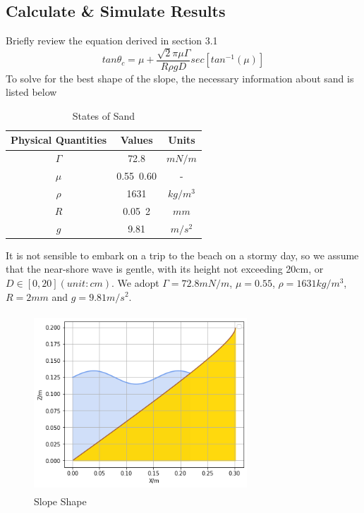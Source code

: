 \documentclass[12pt]{article}
\begin{document}
\subsection{Calculate \& Simulate Results}
Briefly review the equation derived in section 3.1
$$tan\theta_c = \mu + \frac{\sqrt{2}\pi\mu\Gamma}{R\rho gD}sec[tan^{-1}(\mu)]$$
To solve for the best shape of the slope, the necessary information about sand is listed below
\begin{table}[H]
    \caption{States of Sand}
    \vspace{10pt}
    \centering
    \begin{tabular}{ccc}
        \hline
        Physical Quantities & Values    & Units    \\
        \hline
        $\Gamma$            & 72.8      & $mN/m$   \\
        $\mu$               & 0.55~0.60 & -        \\
        $\rho$              & 1631      & $kg/m^3$ \\
        $R$                 & 0.05~2    & $mm$     \\
        $g$                 & 9.81      & $m/s^2$  \\
        \hline
    \end{tabular}
    \label{bs2}
\end{table}
\par
It is not sensible to embark on a trip to the beach on a stormy day, so we assume that the near-shore wave is gentle, with its height not exceeding 20cm, or $D \in [0, 20](unit:cm)$.
We adopt $\Gamma = 72.8mN/m$, $\mu = 0.55$, $\rho = 1631kg/m^3$, $R = 2mm$ and $g = 9.81m/s^2$.
\begin{figure}[H]
    \centering
    \includegraphics[width=8cm, height = 6.67cm]{sand5.png}
    \caption{Slope Shape}
    \label{fig:slope_shape}
\end{figure}
\end{document}
